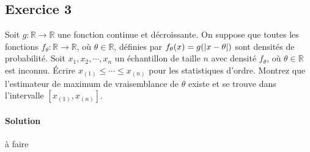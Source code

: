 \documentclass[../main.tex]{subfiles}
\begin{document}
\begin{CJK*}{UTF8}{gbsn}

\section*{Exercice 3}

Soit $g : \mathbb{R} \to \mathbb{R}$ une fonction continue et décroissante. 
On suppose que toutes les fonctions $f_{\theta} : \mathbb{R} \to \mathbb{R}$, 
où $\theta \in \mathbb{R}$, définies par $f_{\theta}(x) = g(\abs{x - \theta})$
sont densités de probabilité.
Soit $x_1, x_2, \cdots, x_n$ un échantillon de taille $n$ avec densité
$f_{\theta}$, où $\theta \in \mathbb{R}$ est inconnu.
Écrire $x_{(1)} \leqslant \cdots \leqslant x_{(n)}$ pour les statistiques d'ordre.
Montrez que l'estimateur de maximum de vraisemblance de $\theta$ existe et se trouve 
dans l'intervalle $[x_{(1)}, x_{(n)}]$.

\paragraph{Solution}

à faire
\end{CJK*}
\end{document}
